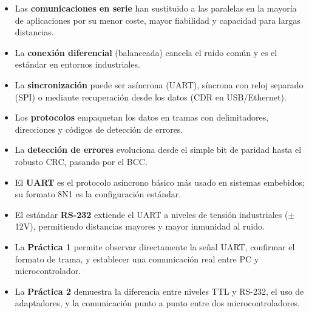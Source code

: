 \begin{itemize}
    \item Las \textbf{comunicaciones en serie} han sustituido a las paralelas en la mayoría de aplicaciones por su menor coste, mayor fiabilidad y capacidad para largas distancias.
    \item La \textbf{conexión diferencial} (balanceada) cancela el ruido común y es el estándar en entornos industriales.
    \item La \textbf{sincronización} puede ser asíncrona (UART), síncrona con reloj separado (SPI) o mediante recuperación desde los datos (CDR en USB/Ethernet).
    \item Los \textbf{protocolos} empaquetan los datos en tramas con delimitadores, direcciones y códigos de detección de errores.
    \item La \textbf{detección de errores} evoluciona desde el simple bit de paridad hasta el robusto CRC, pasando por el BCC.
    \item El \textbf{UART} es el protocolo asíncrono básico más usado en sistemas embebidos; su formato 8N1 es la configuración estándar.
    \item El estándar \textbf{RS-232} extiende el UART a niveles de tensión industriales ($\pm$12V), permitiendo distancias mayores y mayor inmunidad al ruido.
    \item La \textbf{Práctica 1} permite observar directamente la señal UART, confirmar el formato de trama, y establecer una comunicación real entre PC y microcontrolador.
    \item La \textbf{Práctica 2} demuestra la diferencia entre niveles TTL y RS-232, el uso de adaptadores, y la comunicación punto a punto entre dos microcontroladores.
\end{itemize}
